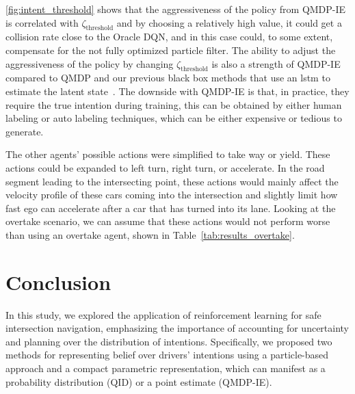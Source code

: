 \ref{fig:intent_threshold} shows that the aggressiveness of the policy from QMDP-IE is correlated with $\zeta_\text{threshold}$ and by choosing a relatively high value, it could get a collision rate close to the Oracle DQN, and in this case could, to some extent, compensate for the not fully optimized particle filter. The ability to adjust the aggressiveness of the policy by changing $\zeta_\text{threshold}$ is also a strength of QMDP-IE compared to QMDP and our previous black box methods that use an \gls{lstm} to estimate the latent state~\cite{Tram2018}. %
The downside with QMDP-IE is that, in practice, they require the true intention during training, this can be obtained by either human labeling or auto labeling techniques, which can be either expensive or tedious to generate. 

The other agents' possible actions were simplified to take way or yield. These actions could be expanded to left turn, right turn, or accelerate. In the road segment leading to the intersecting point, these actions would mainly affect the velocity profile of these cars coming into the intersection and slightly limit how fast ego can accelerate after a car that has turned into its lane. Looking at the overtake scenario, we can assume that these actions would not perform worse than using an overtake agent, shown in Table~\ref{tab:results_overtake}.

\section{Conclusion}
\label{sec:conclusion}
In this study, we explored the application of reinforcement learning for safe intersection navigation, emphasizing the importance of accounting for uncertainty and planning over the distribution of intentions. Specifically, we proposed two methods for representing belief over drivers' intentions using a particle-based approach and a compact parametric representation, which can manifest as a probability distribution (QID) or a point estimate (QMDP-IE).

